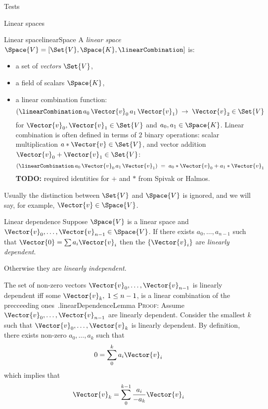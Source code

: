 \documentclass{PalisadesLakesBook}
\begin{document}
\begin{plSection}{Tests}
\begin{plSection}{Linear spaces}
\begin{plDefinition}{Linear space}{linearSpace}
A \textit{linear space} 
$\Space{V} = 
\left[ \Set{V}, \Space{K}, \linearCombination \right]$
 is:
\begin{itemize}
  \item a set of \textit{vectors} $\Set{V}$,
  \item a field  of scalars $\Space{K}$,
  \item a linear combination function: 
\begin{equation}
\left( \linearCombination 
\, a_0 \, \Vector{v}_0 \, a_1 \, \Vector{v}_1 \right) \; 
 \rightarrow \; \Vector{v}_2  \in \Set{V}
\end{equation}
for $\Vector{v}_0, \Vector{v}_1 \in \Set{V} $
and $a_0, a_1 \in \Space{K}$.
Linear combination is often defined in terms of
$2$ binary operations:
scalar multiplication $a * \Vector{v} \in \Set{V}$,
and vector addition $\Vector{v}_0 + \Vector{v}_1 \in \Set{V}$:
\begin{equation}
\left( \linearCombination 
\, a_0 \, \Vector{v}_0 \, a_1 \, \Vector{v}_1 \right) \; 
= \; a_0*\Vector{v}_0 + a_1*\Vector{v}_1
\end{equation}
\textbf{TODO:} required identities for $+$ and $*$ 
from Spivak or Halmos.
\end{itemize}
\end{plDefinition}

Usually the distinction between $\Set{V}$ and $\Space{V}$ 
is ignored, and we will say, for example, 
$\Vector{v} \in \Space{V}$.

\begin{plDefinition}{Linear dependence}{}
Suppose $\Space{V}$ is a linear space and
$\Vector{v}_0, \ldots , \Vector{v}_{n-1} \in \Space{V}$.
If there exists $a_0, \ldots , a_{n-1}$ such that
$\Vector{0} = \sum a_i \Vector{v}_i$ then the $\{ \Vector{v}_i \}$
are \textit{linearly dependent}.
\cite[section~5]{Halmos:1958:Finite}

Otherwise they are \textit{linearly independent}.
\end{plDefinition}

\begin{plLemma}{The set of non-zero vectors
 $\Vector{v}_0, \ldots ,\Vector{v}_{n-1}$
is linearly dependent iff some $\Vector{v}_k, \; 1 \leq n-1$, 
is a linear combination of the precceeding 
ones~\cite[Section 6]{Halmos:1958:Finite}.}{linearDependenceLemma}
\textsc{Proof:}
Assume  $\Vector{v}_0, \ldots ,\Vector{v}_{n-1}$ are linearly dependent.
Consider the smallest $k$ such that 
$\Vector{v}_0, \ldots ,\Vector{v}_{k}$ is linearly dependent.
By definition,
there exists non-zero $a_0, \ldots ,a_{k}$ such that
\begin{equation}
0 = \sum_0^k a_i \Vector{v}_i
\end{equation}
which implies that
\begin{equation}
\Vector{v}_k = \sum_0^{k-1} \frac{a_i}{- a_k} \Vector{v}_i
\end{equation}
\end{plLemma}


\end{plSection}
\end{plSection}
\end{document}
